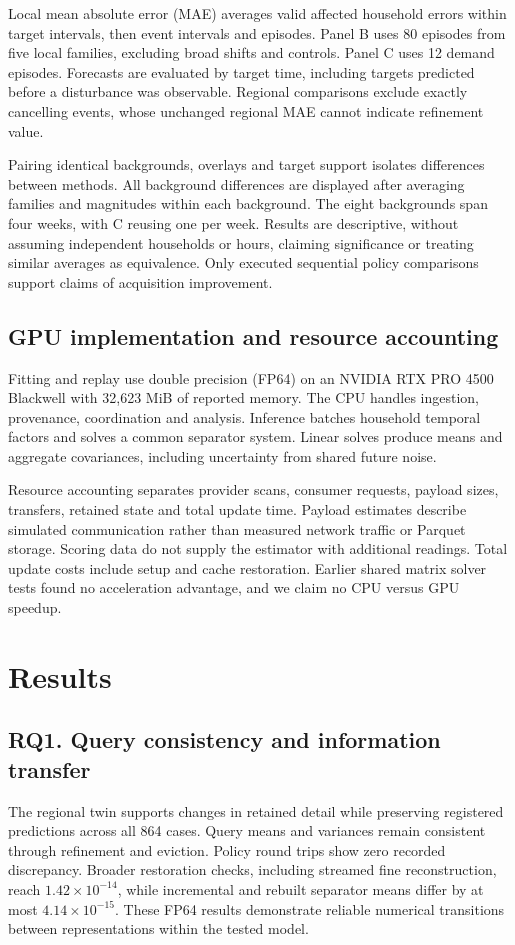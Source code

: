 \documentclass[conference]{IEEEtran}
\begin{document}
Local mean absolute error (MAE) averages valid affected household errors within target intervals, then event intervals and episodes. Panel B uses 80 episodes from five local families, excluding broad shifts and controls. Panel C uses 12 demand episodes. Forecasts are evaluated by target time, including targets predicted before a disturbance was observable. Regional comparisons exclude exactly cancelling events, whose unchanged regional MAE cannot indicate refinement value.

Pairing identical backgrounds, overlays and target support isolates differences between methods. All background differences are displayed after averaging families and magnitudes within each background. The eight backgrounds span four weeks, with C reusing one per week. Results are descriptive, without assuming independent households or hours, claiming significance or treating similar averages as equivalence. Only executed sequential policy comparisons support claims of acquisition improvement.




\subsection{GPU implementation and resource accounting}
Fitting and replay use double precision (FP64) on an NVIDIA RTX PRO 4500 Blackwell with 32,623 MiB of reported memory. The CPU handles ingestion, provenance, coordination and analysis. Inference batches household temporal factors and solves a common separator system. Linear solves produce means and aggregate covariances, including uncertainty from shared future noise.

Resource accounting separates provider scans, consumer requests, payload sizes, transfers, retained state and total update time. Payload estimates describe simulated communication rather than measured network traffic or Parquet storage. Scoring data do not supply the estimator with additional readings. Total update costs include setup and cache restoration. Earlier shared matrix solver tests found no acceleration advantage, and we claim no CPU versus GPU speedup.









\section{Results}
\subsection{RQ1. Query consistency and information transfer}
The regional twin supports changes in retained detail while preserving registered predictions across all 864 cases. Query means and variances remain consistent through refinement and eviction. Policy round trips show zero recorded discrepancy. Broader restoration checks, including streamed fine reconstruction, reach $1.42\times10^{-14}$, while incremental and rebuilt separator means differ by at most $4.14\times10^{-15}$. These FP64 results demonstrate reliable numerical transitions between representations within the tested model.
\end{document}
